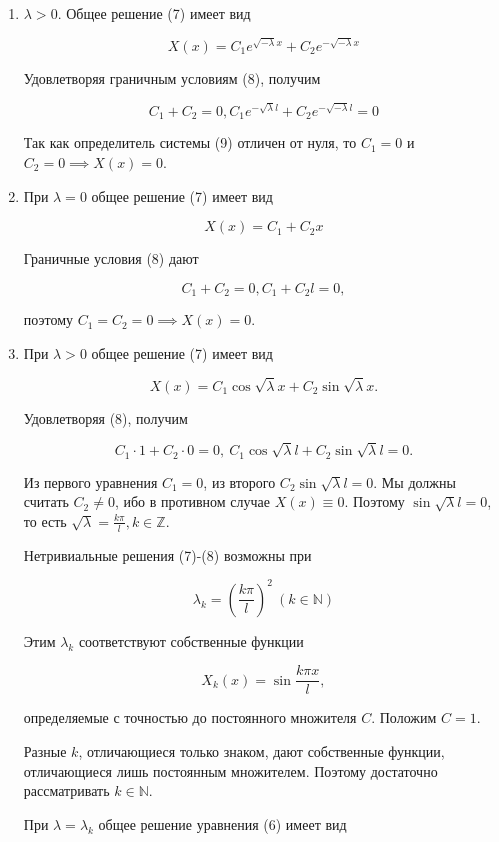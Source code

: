 \begin{enumerate}
	\item{
			$\lambda>0$. Общее решение (7) имеет вид

			\[
				X(x) = C_1 e^{\sqrt{-\lambda}x} + C_2 e^{-\sqrt{-\lambda}x}
			\]

			Удовлетворяя граничным условиям (8), получим

			\[
				C_1 + C_2 = 0, C_1 e^{-\sqrt{\lambda} l}+C_2 e^{-\sqrt{-\lambda}l}=0 \tag{9}
			\]

			Так как определитель системы (9) отличен от нуля, то $C_1=0$ и $C_2=0 \implies X(x)=0$. 
	}
	\item{
			При $\lambda=0$ общее решение (7) имеет вид

			\[
				X(x) = C_1 + C_2 x
			\]

			Граничные условия (8) дают

			\[
				C_1 + C_2 = 0, C_1 + C_2 l = 0,
			\]

			поэтому $C_1=C_2=0 \implies X(x)=0.$
	}
	\item{
			При $\lambda > 0$ общее решение (7) имеет вид

			\[
				X(x) = C_1 \cos \sqrt{\lambda} x + C_2 \sin \sqrt{\lambda} x.
			\]

			Удовлетворяя (8), получим

			\[
				C_1 \cdot 1 + C_2 \cdot 0 = 0, ~ C_1 \cos \sqrt{\lambda} l + C_2 \sin \sqrt{\lambda} l = 0.
			\]

			Из первого уравнения $C_1 = 0$, из второго $C_2 \sin \sqrt{\lambda} l = 0$. Мы должны считать $C_2 \ne 0$, ибо в противном случае $X(x) \equiv 0$. Поэтому $\sin \sqrt{\lambda} l = 0$, то есть $\sqrt{\lambda} = \frac{k \pi}{l}, k \in \mathbb{Z}$.

			Нетривиальные решения (7)-(8) возможны при

			\[
				\lambda_k = \left( \frac{k \pi}{l} \right)^2 ~ (k \in \mathbb{N})
			\]

			Этим $\lambda_k$ соответствуют собственные функции

			\[
				X_k (x) = \sin \frac{k \pi x}{l},
			\]

			определяемые с точностью до постоянного множителя $C$. Положим $C=1$.

			Разные $k$, отличающиеся только знаком, дают собственные функции, отличающиеся лишь постоянным множителем. Поэтому достаточно рассматривать $k \in \mathbb{N}$.

			При $\lambda = \lambda_k$ общее решение уравнения (6) имеет вид

}
\end{enumerate}
